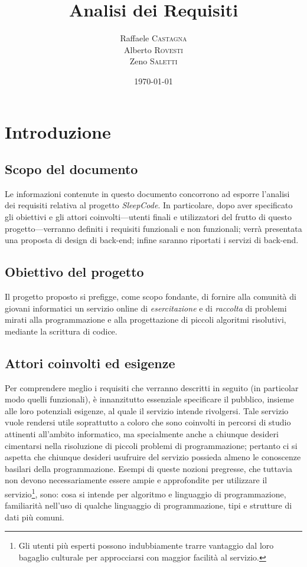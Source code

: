 \documentclass[11pt, a4paper]{article}
\title{Analisi dei Requisiti}
\author{Raffaele \textsc{Castagna}\\
Alberto \textsc{Rovesti}\\
Zeno \textsc{Saletti}}
\date{\today}
\theoremstyle{definition}
\begin{document}


\tableofcontents


\newpage
\section{Introduzione}
\subsection{Scopo del documento}
Le informazioni contenute in questo documento concorrono ad esporre l'analisi
dei requisiti relativa al progetto \textit{SleepCode}. In particolare, dopo
aver specificato gli obiettivi e gli attori coinvolti—utenti finali e
utilizzatori del frutto di questo progetto—verranno definiti i requisiti
funzionali e non funzionali; verrà presentata una proposta di design di
back-end; infine saranno riportati i servizi di back-end.


\subsection{Obiettivo del progetto}
Il progetto proposto si prefigge, come scopo fondante, di fornire alla comunità
di giovani informatici un servizio online di \textit{esercitazione} e di
\textit{raccolta} di problemi mirati alla programmazione e alla progettazione
di piccoli algoritmi risolutivi, mediante la scrittura di codice.

\subsection{Attori coinvolti ed esigenze}
Per comprendere meglio i requisiti che verranno descritti in seguito (in
particolar modo quelli funzionali), è innanzitutto essenziale specificare
il pubblico, insieme alle loro potenziali esigenze, al quale il servizio
intende rivolgersi.
Tale servizio vuole rendersi utile soprattutto a coloro che sono coinvolti
in percorsi di studio attinenti all'ambito informatico, ma specialmente anche
a chiunque desideri cimentarsi nella risoluzione di piccoli problemi di
programmazione; pertanto ci si aspetta che chiunque desideri usufruire del
servizio possieda almeno le conoscenze basilari della programmazione. Esempi
di queste nozioni pregresse, che tuttavia non devono necessariamente essere ampie e approfondite per utilizzare il servizio\footnote{Gli utenti più esperti possono indubbiamente trarre vantaggio dal loro bagaglio culturale per
approcciarsi con maggior facilità al servizio.}, sono: cosa si intende per
algoritmo e linguaggio di programmazione, familiarità nell'uso di qualche
linguaggio di programmazione, tipi e strutture di dati più comuni.
\end{document}
